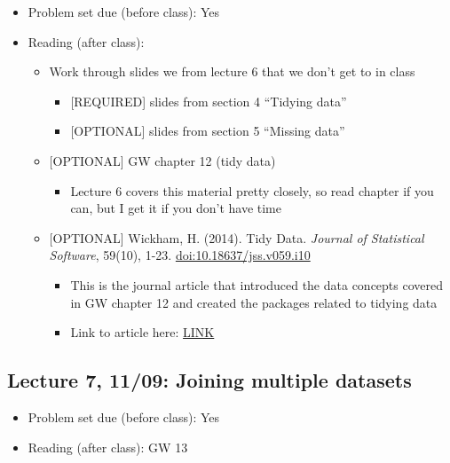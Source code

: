 \documentclass[11pt,]{article}
\providecommand{\tightlist}{%
  \setlength{\itemsep}{0pt}\setlength{\parskip}{0pt}}
\begin{document}
\begin{itemize}
\tightlist
\item
  Problem set due (before class): Yes
\item
  Reading (after class):

  \begin{itemize}
  \tightlist
  \item
    Work through slides we from lecture 6 that we don't get to in class

    \begin{itemize}
    \tightlist
    \item
      {[}REQUIRED{]} slides from section 4 ``Tidying data''
    \item
      {[}OPTIONAL{]} slides from section 5 ``Missing data''
    \end{itemize}
  \item
    {[}OPTIONAL{]} GW chapter 12 (tidy data)

    \begin{itemize}
    \tightlist
    \item
      Lecture 6 covers this material pretty closely, so read chapter if
      you can, but I get it if you don't have time
    \end{itemize}
  \item
    {[}OPTIONAL{]} Wickham, H. (2014). Tidy Data. \emph{Journal of
    Statistical Software}, 59(10), 1-23. \url{doi:10.18637/jss.v059.i10}

    \begin{itemize}
    \tightlist
    \item
      This is the journal article that introduced the data concepts
      covered in GW chapter 12 and created the packages related to
      tidying data
    \item
      Link to article here:
      \href{https://www.jstatsoft.org/article/view/v059i10}{LINK}
    \end{itemize}
  \end{itemize}
\end{itemize}

\subsection{Lecture 7, 11/09: Joining multiple
datasets}\label{lecture-7-1109-joining-multiple-datasets}

\begin{itemize}
\tightlist
\item
  Problem set due (before class): Yes
\item
  Reading (after class): GW 13
\end{itemize}
\end{document}
